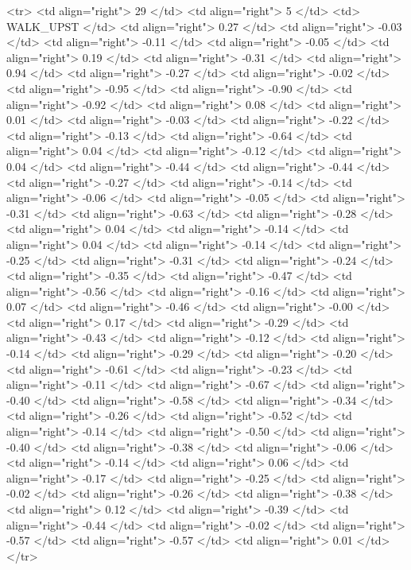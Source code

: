   <tr> <td align="right"> 29 </td> <td align="right">   5 </td> <td> WALK_UPST </td> <td align="right"> 0.27 </td> <td align="right"> -0.03 </td> <td align="right"> -0.11 </td> <td align="right"> -0.05 </td> <td align="right"> 0.19 </td> <td align="right"> -0.31 </td> <td align="right"> 0.94 </td> <td align="right"> -0.27 </td> <td align="right"> -0.02 </td> <td align="right"> -0.95 </td> <td align="right"> -0.90 </td> <td align="right"> -0.92 </td> <td align="right"> 0.08 </td> <td align="right"> 0.01 </td> <td align="right"> -0.03 </td> <td align="right"> -0.22 </td> <td align="right"> -0.13 </td> <td align="right"> -0.64 </td> <td align="right"> 0.04 </td> <td align="right"> -0.12 </td> <td align="right"> 0.04 </td> <td align="right"> -0.44 </td> <td align="right"> -0.44 </td> <td align="right"> -0.27 </td> <td align="right"> -0.14 </td> <td align="right"> -0.06 </td> <td align="right"> -0.05 </td> <td align="right"> -0.31 </td> <td align="right"> -0.63 </td> <td align="right"> -0.28 </td> <td align="right"> 0.04 </td> <td align="right"> -0.14 </td> <td align="right"> 0.04 </td> <td align="right"> -0.14 </td> <td align="right"> -0.25 </td> <td align="right"> -0.31 </td> <td align="right"> -0.24 </td> <td align="right"> -0.35 </td> <td align="right"> -0.47 </td> <td align="right"> -0.56 </td> <td align="right"> -0.16 </td> <td align="right"> 0.07 </td> <td align="right"> -0.46 </td> <td align="right"> -0.00 </td> <td align="right"> 0.17 </td> <td align="right"> -0.29 </td> <td align="right"> -0.43 </td> <td align="right"> -0.12 </td> <td align="right"> -0.14 </td> <td align="right"> -0.29 </td> <td align="right"> -0.20 </td> <td align="right"> -0.61 </td> <td align="right"> -0.23 </td> <td align="right"> -0.11 </td> <td align="right"> -0.67 </td> <td align="right"> -0.40 </td> <td align="right"> -0.58 </td> <td align="right"> -0.34 </td> <td align="right"> -0.26 </td> <td align="right"> -0.52 </td> <td align="right"> -0.14 </td> <td align="right"> -0.50 </td> <td align="right"> -0.40 </td> <td align="right"> -0.38 </td> <td align="right"> -0.06 </td> <td align="right"> -0.14 </td> <td align="right"> 0.06 </td> <td align="right"> -0.17 </td> <td align="right"> -0.25 </td> <td align="right"> -0.02 </td> <td align="right"> -0.26 </td> <td align="right"> -0.38 </td> <td align="right"> 0.12 </td> <td align="right"> -0.39 </td> <td align="right"> -0.44 </td> <td align="right"> -0.02 </td> <td align="right"> -0.57 </td> <td align="right"> -0.57 </td> <td align="right"> 0.01 </td> </tr>
